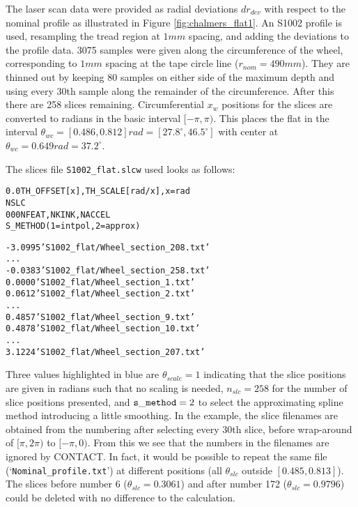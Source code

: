 \documentclass[12pt]{report}
\begin{document}
The laser scan data were provided as radial deviations $dr_{dev}$ with
respect to the nominal profile as illustrated in Figure
\ref{fig:chalmers_flat1}. An S1002 profile is used, resampling the tread
region at $1\unit{mm}$ spacing, and adding the deviations to the profile
data. 3075 samples were given along the circumference
of the wheel, corresponding to $1\unit{mm}$ spacing at the tape circle
line ($r_{nom}=490\unit{mm}$). They are thinned out by keeping 80
samples on either side of the maximum depth and using every 30th sample
along the remainder of the circumference. After this there are 258 slices
remaining. Circumferential $x_w$ positions for the slices are converted
to radians in the basic interval $[-\pi,\pi)$. This
places the flat in the interval $\theta_{wc}=[0.486,0.812]\unit{rad}=
[27.8^\circ,46.5^\circ]$ with center at $\theta_{wc}=0.649\unit{rad}=
37.2^\circ$.

The slices file {\tt S1002\_flat.slcw} used looks as follows:

\begin{alltt}\small
% wheel flat on S1002 profile, 
% data courtesy M. Maglio / Chalmers University of Technology

     0.0          TH_OFFSET [x], TH_SCALE [rad/x], x=rad
                  NSLC
       0    0    0   NFEAT, NKINK, NACCEL
                    S_METHOD (1=intpol, 2=approx)

% slice positions TH_SLC [x] and filenames WFNAME per slice

   -3.0995   'S1002_flat/Wheel_section_208.txt'
              ...
   -0.0383   'S1002_flat/Wheel_section_258.txt'
    0.0000   'S1002_flat/Wheel_section_1.txt'
    0.0612   'S1002_flat/Wheel_section_2.txt'
              ...
    0.4857   'S1002_flat/Wheel_section_9.txt'   % start of wheel flat
    0.4878   'S1002_flat/Wheel_section_10.txt'
              ...
    3.1224   'S1002_flat/Wheel_section_207.txt'
\end{alltt}

Three values highlighted in blue are $\theta_{scale}=1$ indicating
that the slice positions are given in radians such that no scaling is
needed, $n_{slc}=258$ for the number of slice positions presented, and
${\tt s\_method}=2$ to select the approximating spline method introducing a
little smoothing. In the example, the slice filenames are obtained from the
numbering after selecting every 30th slice, before wrap-around of
$[\pi,2\pi)$ to $[-\pi,0)$. From this we see that the numbers in the
filenames are ignored by CONTACT. In fact, it would be possible to
repeat the same file (`{\tt Nominal\_profile.txt}') at different positions
(all $\theta_{slc}$ outside $[0.485,0.813]$). The slices before number 6
($\theta_{slc}=0.3061$) and after number 172 ($\theta_{slc}=0.9796$) could
be deleted with no difference to the calculation.
\end{document}
